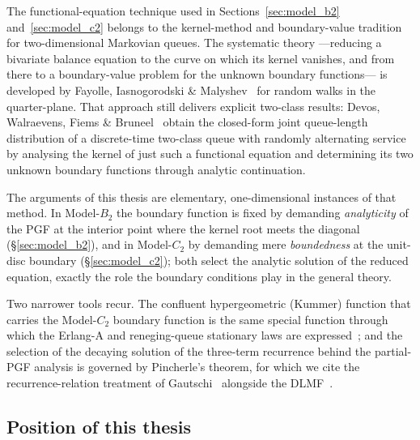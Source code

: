 The functional-equation technique used in Sections~\ref{sec:model_b2} and~\ref{sec:model_c2} belongs to the kernel-method and boundary-value tradition for two-dimensional Markovian queues. The systematic theory ---reducing a bivariate balance equation to the curve on which its kernel vanishes, and from there to a boundary-value problem for the unknown boundary functions--- is developed by Fayolle, Iasnogorodski \& Malyshev~\cite{fayolle1999random} for random walks in the quarter-plane. That approach still delivers explicit two-class results: Devos, Walraevens, Fiems \& Bruneel~\cite{devos2020alternating} obtain the closed-form joint queue-length distribution of a discrete-time two-class queue with randomly alternating service by analysing the kernel of just such a functional equation and determining its two unknown boundary functions through analytic continuation.

The arguments of this thesis are elementary, one-dimensional instances of that method. In Model-$B_2$ the boundary function is fixed by demanding \emph{analyticity} of the PGF at the interior point where the kernel root meets the diagonal (\S\ref{sec:model_b2}), and in Model-$C_2$ by demanding mere \emph{boundedness} at the unit-disc boundary (\S\ref{sec:model_c2}); both select the analytic solution of the reduced equation, exactly the role the boundary conditions play in the general theory.

Two narrower tools recur. The confluent hypergeometric (Kummer) function that carries the Model-$C_2$ boundary function is the same special function through which the Erlang-A and reneging-queue stationary laws are expressed~\cite{zeltyn2005callcenters,kapodistria2011synchronized,dlmf}; and the selection of the decaying solution of the three-term recurrence behind the partial-PGF analysis is governed by Pincherle's theorem, for which we cite the recurrence-relation treatment of Gautschi~\cite{gautschi1967computational} alongside the DLMF~\cite{dlmf}.

\subsection*{Position of this thesis}

